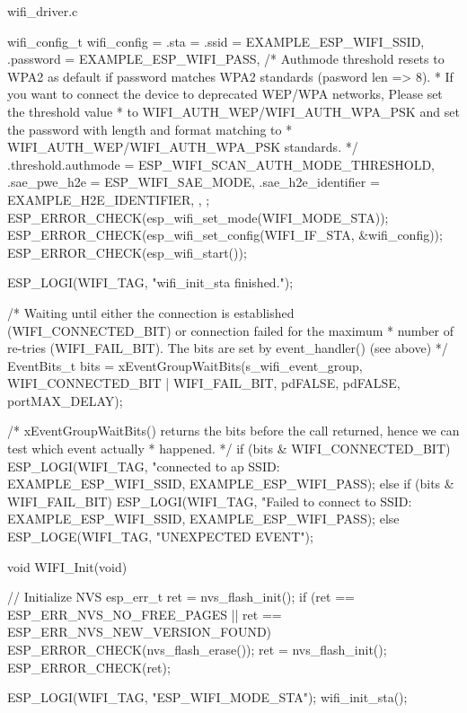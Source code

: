 \documentclass[lang=cn,newtx,10pt,scheme=chinese]{elegantbook}
\begin{document}
\begin{mycode}{wifi\_driver.c}
{    wifi_config_t wifi_config = {
        .sta = {
            .ssid = EXAMPLE_ESP_WIFI_SSID,
            .password = EXAMPLE_ESP_WIFI_PASS,
            /* Authmode threshold resets to WPA2 as default if password matches WPA2 standards (pasword len => 8).
             * If you want to connect the device to deprecated WEP/WPA networks, Please set the threshold value
             * to WIFI_AUTH_WEP/WIFI_AUTH_WPA_PSK and set the password with length and format matching to
             * WIFI_AUTH_WEP/WIFI_AUTH_WPA_PSK standards.
             */
            .threshold.authmode = ESP_WIFI_SCAN_AUTH_MODE_THRESHOLD,
            .sae_pwe_h2e = ESP_WIFI_SAE_MODE,
            .sae_h2e_identifier = EXAMPLE_H2E_IDENTIFIER,
        },
    };
    ESP_ERROR_CHECK(esp_wifi_set_mode(WIFI_MODE_STA));
    ESP_ERROR_CHECK(esp_wifi_set_config(WIFI_IF_STA, &wifi_config));
    ESP_ERROR_CHECK(esp_wifi_start());

    ESP_LOGI(WIFI_TAG, "wifi_init_sta finished.");

    /* Waiting until either the connection is established (WIFI_CONNECTED_BIT) or connection failed for the maximum
     * number of re-tries (WIFI_FAIL_BIT). The bits are set by event_handler() (see above) */
    EventBits_t bits = xEventGroupWaitBits(s_wifi_event_group,
                                           WIFI_CONNECTED_BIT | WIFI_FAIL_BIT,
                                           pdFALSE,
                                           pdFALSE,
                                           portMAX_DELAY);

    /* xEventGroupWaitBits() returns the bits before the call returned, hence we can test which event actually
     * happened. */
    if (bits & WIFI_CONNECTED_BIT)
    {
        ESP_LOGI(WIFI_TAG, "connected to ap SSID:%
                 EXAMPLE_ESP_WIFI_SSID, EXAMPLE_ESP_WIFI_PASS);
    }
    else if (bits & WIFI_FAIL_BIT)
    {
        ESP_LOGI(WIFI_TAG, "Failed to connect to SSID:%
                 EXAMPLE_ESP_WIFI_SSID, EXAMPLE_ESP_WIFI_PASS);
    }
    else
    {
        ESP_LOGE(WIFI_TAG, "UNEXPECTED EVENT");
    }
}

void WIFI_Init(void)
{
    // Initialize NVS
    esp_err_t ret = nvs_flash_init();
    if (ret == ESP_ERR_NVS_NO_FREE_PAGES || ret == ESP_ERR_NVS_NEW_VERSION_FOUND)
    {
        ESP_ERROR_CHECK(nvs_flash_erase());
        ret = nvs_flash_init();
    }
    ESP_ERROR_CHECK(ret);

    ESP_LOGI(WIFI_TAG, "ESP_WIFI_MODE_STA");
    wifi_init_sta();
}
\end{mycode}
\end{document}
